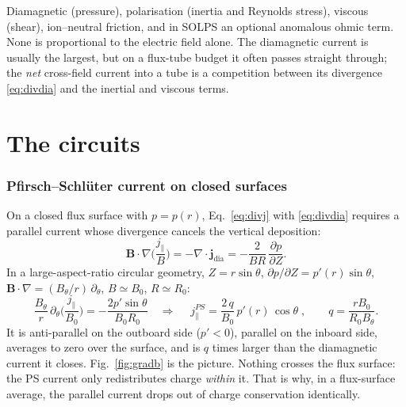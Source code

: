 \documentclass[11pt,a4paper]{article}
\newcommand{\bB}{\mathbf{B}}
\newcommand{\divg}{\nabla\!\cdot\!}
\newcommand{\jpar}{j_\parallel}
\newcommand{\jdia}{\mathbf{j}_{\mathrm{dia}}}
\begin{document}
\begin{tcolorbox}[key={Key: what carries current across the field}]
Diamagnetic (pressure), polarisation (inertia and Reynolds stress), viscous (shear), ion--neutral friction, and in
SOLPS an optional anomalous ohmic term. None is proportional to the electric field alone. The diamagnetic current is
usually the largest, but on a flux-tube budget it often passes straight through; the \emph{net} cross-field current
into a tube is a competition between its divergence \eqref{eq:divdia} and the inertial and viscous terms.
\end{tcolorbox}

\part{The circuits}

\section{Pfirsch--Schl\"uter current on closed surfaces}
\label{sec:ps}

On a closed flux surface with $p=p(r)$, Eq.~\eqref{eq:divj} with \eqref{eq:divdia} requires a parallel current whose
divergence cancels the vertical deposition:
\begin{equation}
  \bB\cdot\nabla\Big(\frac{\jpar}{B}\Big) = -\divg\jdia = -\frac{2}{BR}\,\frac{\partial p}{\partial Z}.
  \label{eq:psode}
\end{equation}
In a large-aspect-ratio circular geometry, $Z = r\sin\theta$, $\partial p/\partial Z = p'(r)\sin\theta$,
$\bB\cdot\nabla = (B_\theta/r)\,\partial_\theta$, $B\simeq B_0$, $R\simeq R_0$:
\begin{equation}
  \frac{B_\theta}{r}\,\partial_\theta\Big(\frac{\jpar}{B_0}\Big) = -\frac{2 p'\sin\theta}{B_0 R_0}
  \quad\Longrightarrow\quad
  \boxed{\;\jpar^{PS} = \frac{2\,q}{B_0}\,p'(r)\,\cos\theta\;},\qquad q = \frac{r B_0}{R_0 B_\theta}.
  \label{eq:ps}
\end{equation}
It is anti-parallel on the outboard side ($p'<0$), parallel on the inboard side, averages to zero over the surface,
and is $q$ times larger than the diamagnetic current it closes. Fig.~\ref{fig:gradb} is the picture. Nothing crosses
the flux surface: the PS current only redistributes charge \emph{within} it. That is why, in a flux-surface average,
the parallel current drops out of charge conservation identically.
\end{document}
